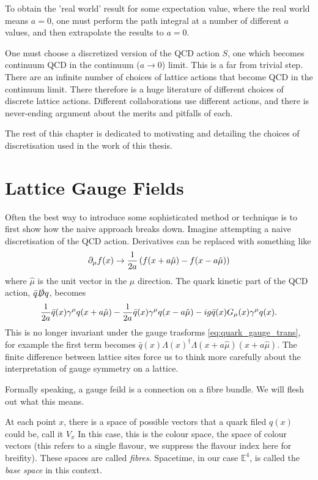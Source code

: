 To obtain the 'real world' result for some expectation value, where the real world means $a=0$, one must perform the path integral at a number of different $a$ values, and then extrapolate the results to $a=0$.

One must choose a discretized version of the QCD action $S$, one which becomes continuum QCD in the continuum ($a\to 0$) limit. This is a far from trivial step. There are an infinite number of choices of lattice actions that become QCD in the continuum limit. There therefore is a huge literature of different choices of discrete lattice actions. Different collaborations use different actions, and there is never-ending argument about the merits and pitfalls of each.

The rest of this chapter is dedicated to motivating and detailing the choices of discretisation used in the work of this thesis.

\section{Lattice Gauge Fields}
\label{sec:gaugefields}

Often the best way to introduce some sophisticated method or technique is to first show how the naive approach breaks down. Imagine attempting a naive discretisation of the QCD action. Derivatives can be replaced with something like
\begin{align}
  \partial_{\mu}f(x) \to {1\over 2a} \left( f(x+a\hat{\mu}) - f(x-a\hat{\mu}) \right)
\end{align}
where $\hat{\mu}$ is the unit vector in the $\mu$ direction. The quark kinetic part of the QCD action, $\bar{q}\slashed{D}q$, becomes
\begin{align}
  {1\over 2a} \bar{q}(x)\gamma^{\mu}q(x+a\hat{\mu}) - {1\over 2a} \bar{q}(x)\gamma^{\mu}q(x-a\hat{\mu}) - ig\bar{q}(x)G_{\mu}(x)\gamma^{\mu} q(x).
\end{align}
This is no longer invariant under the gauge trasforms \eqref{eq:quark_gauge_trans}, for example the first term becomes $\bar{q}(x)\Lambda(x)^{\dagger} \Lambda(x+a\hat{\mu}) (x+a\hat{\mu})$. The finite difference between lattice sites force us to think more carefully about the interpretation of gauge symmetry on a lattice.

Formally speaking, a gauge feild is a connection on a fibre bundle. We will flesh out what this means.

At each point $x$, there is a space of possible vectors that a quark filed $q(x)$ could be, call it $V_x$ In this case, this is the colour space, the space of colour vectors (this refers to a single flavour, we suppress the flavour index here for breifity). These spaces are called {\it{fibres}}. Spacetime, in our case $\mathbb{E}^4$, is called the {\it{base space}} in this context.

